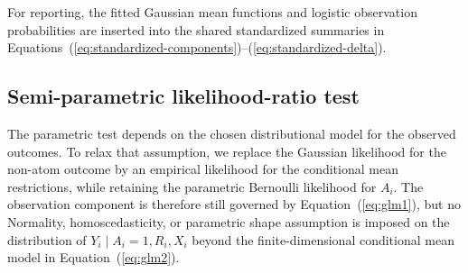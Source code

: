 \documentclass[11pt]{article}
\begin{document}
For reporting, the fitted Gaussian mean functions and logistic observation probabilities are inserted into the shared standardized summaries in Equations~(\ref{eq:standardized-components})--(\ref{eq:standardized-delta}).

\subsection{Semi-parametric likelihood-ratio test}

The parametric test depends on the chosen distributional model for the observed outcomes. To relax that assumption, we replace the Gaussian likelihood for the non-atom outcome by an empirical likelihood for the conditional mean restrictions, while retaining the parametric Bernoulli likelihood for $A_i$. The observation component is therefore still governed by Equation~(\ref{eq:glm1}), but no Normality, homoscedasticity, or parametric shape assumption is imposed on the distribution of $Y_i \mid A_i = 1, R_i, X_i$ beyond the finite-dimensional conditional mean model in Equation~(\ref{eq:glm2}).
\end{document}
